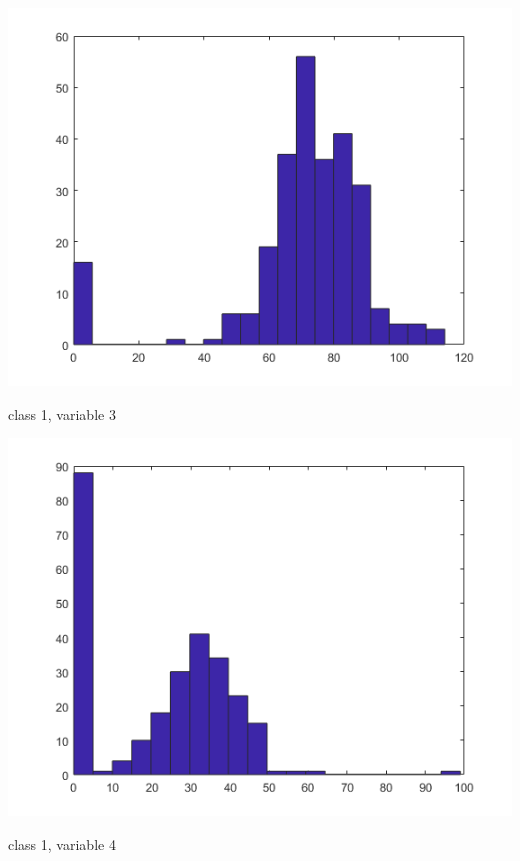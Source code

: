 \documentclass[a4paper]{article}
\begin{document}
\begin{center}
    \includegraphics[scale=1]{1-3.png}
    \caption{class 1, variable 3}
\end{center}

\begin{center}
    \includegraphics[scale=1]{1-4.png}
    \caption{class 1, variable 4}
\end{center}
\end{document}
